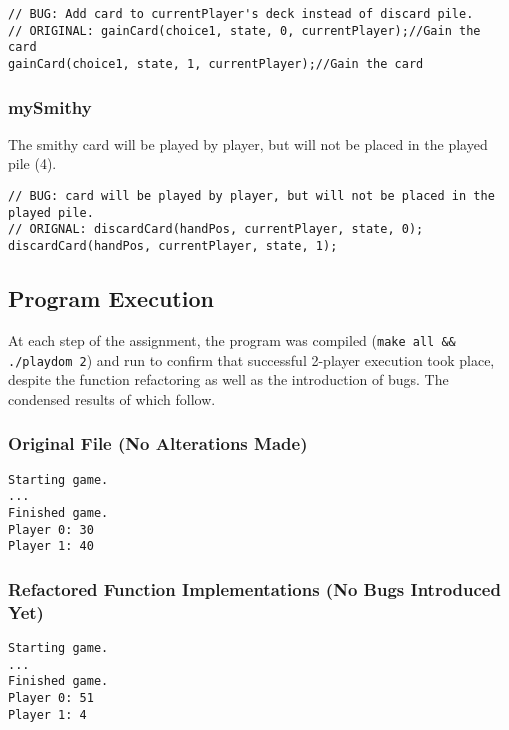 \documentclass[11pt]{article}
\begin{document}
\begin{verbatim}
// BUG: Add card to currentPlayer's deck instead of discard pile.
// ORIGINAL: gainCard(choice1, state, 0, currentPlayer);//Gain the card
gainCard(choice1, state, 1, currentPlayer);//Gain the card
\end{verbatim}

\subsubsection{mySmithy}
\label{sec:org8070788}

The smithy card will be played by player, but will not be placed in the played pile (4).

\begin{verbatim}
// BUG: card will be played by player, but will not be placed in the played pile.
// ORIGNAL: discardCard(handPos, currentPlayer, state, 0);
discardCard(handPos, currentPlayer, state, 1);
\end{verbatim}

\subsection{Program Execution}
\label{sec:orgda8257e}

At each step of the assignment, the program was compiled (\texttt{make all \&\& ./playdom 2}) and run to confirm that successful 2-player execution took place, despite the function refactoring as well as the introduction of bugs. The condensed results of which follow.

\subsubsection{Original File (No Alterations Made)}
\label{sec:org526629d}

\begin{verbatim}
Starting game.
...
Finished game.
Player 0: 30
Player 1: 40
\end{verbatim}

\subsubsection{Refactored Function Implementations (No Bugs Introduced Yet)}
\label{sec:org12dbbad}

\begin{verbatim}
Starting game.
...
Finished game.
Player 0: 51
Player 1: 4
\end{verbatim}
\end{document}
